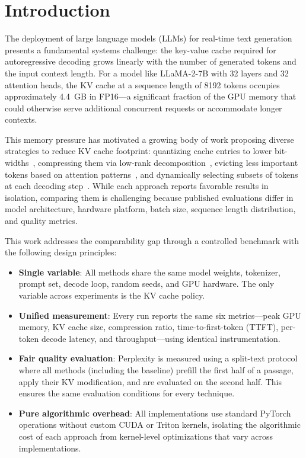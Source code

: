 \documentclass[conference]{IEEEtran}
\begin{document}
\section{Introduction}

The deployment of large language models (LLMs) for real-time text generation presents a fundamental systems challenge: the key-value cache required for autoregressive decoding grows linearly with the number of generated tokens and the input context length. For a model like LLaMA-2-7B with 32 layers and 32 attention heads, the KV cache at a sequence length of 8192 tokens occupies approximately 4.4~GB in FP16---a significant fraction of the GPU memory that could otherwise serve additional concurrent requests or accommodate longer contexts.

This memory pressure has motivated a growing body of work proposing diverse strategies to reduce KV cache footprint: quantizing cache entries to lower bit-widths~\cite{kivi}, compressing them via low-rank decomposition~\cite{xkv}, evicting less important tokens based on attention patterns~\cite{snapkv}, and dynamically selecting subsets of tokens at each decoding step~\cite{topk}. While each approach reports favorable results in isolation, comparing them is challenging because published evaluations differ in model architecture, hardware platform, batch size, sequence length distribution, and quality metrics.

This work addresses the comparability gap through a controlled benchmark with the following design principles:

\begin{itemize}
    \item \textbf{Single variable}: All methods share the same model weights, tokenizer, prompt set, decode loop, random seeds, and GPU hardware. The only variable across experiments is the KV cache policy.
    \item \textbf{Unified measurement}: Every run reports the same six metrics---peak GPU memory, KV cache size, compression ratio, time-to-first-token (TTFT), per-token decode latency, and throughput---using identical instrumentation.
    \item \textbf{Fair quality evaluation}: Perplexity is measured using a split-text protocol where all methods (including the baseline) prefill the first half of a passage, apply their KV modification, and are evaluated on the second half. This ensures the same evaluation conditions for every technique.
    \item \textbf{Pure algorithmic overhead}: All implementations use standard PyTorch operations without custom CUDA or Triton kernels, isolating the algorithmic cost of each approach from kernel-level optimizations that vary across implementations.
\end{itemize}
\end{document}
